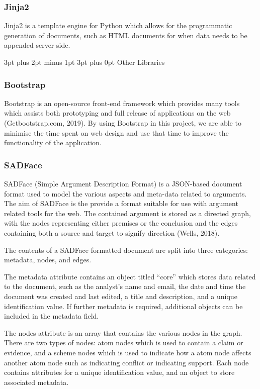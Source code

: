 \documentclass[12pt,a4paper]{article}
\makeatletter
\renewcommand\subsection{\@startsection {subsection}{1}{2mm} %
                               {3pt plus 2pt minus 1pt} %
                               {3pt plus 0pt} %
                               {\normalfont\bfseries}}
\makeatother
\begin{document}
\subsubsection{Jinja2}

Jinja2 is a template engine for Python which allows for the programmatic generation of documents, such as HTML documents for when data needs to be appended server-side.

\subsection{Other Libraries}

\subsubsection{Bootstrap}

Bootstrap is an open-source front-end framework which provides many tools which assists both prototyping and full release of applications on the web (Getbootstrap.com, 2019). By using Bootstrap in this project, we are able to minimise the time spent on web design and use that time to improve the functionality of the application.

\subsubsection{SADFace}

SADFace (Simple Argument Description Format) is a JSON-based document format used to model the various aspects and meta-data related to arguments. The aim of SADFace is the provide a format suitable for use with argument related tools for the web. The contained argument is stored as a directed graph, with the nodes representing either premises or the conclusion and the edges containing both a source and target to signify direction (Wells, 2018).

The contents of a SADFace formatted document are split into three categories: metadata, nodes, and edges.

The metadata attribute contains an object titled ``core'' which stores data related to the document, such as the analyst's name and email, the date and time the document was created and last edited, a title and description, and a unique identification value. If further metadata is required, additional objects can be included in the metadata field.

The nodes attribute is an array that contains the various nodes in the graph. There are two types of nodes: atom nodes which is used to contain a claim or evidence, and a scheme nodes which is used to indicate how a atom node affects another atom node such as indicating conflict or indicating support. Each node contains attributes for a unique identification value, and an object to store associated metadata.
\end{document}
